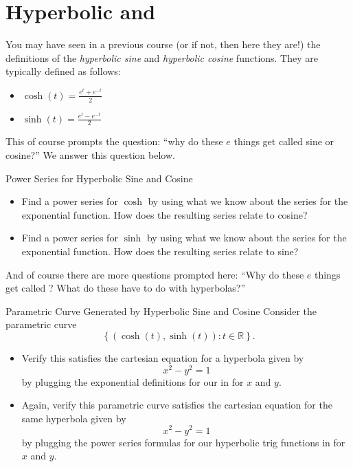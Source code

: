 \section{Hyperbolic  and }

You may have seen in a previous course (or if not, then here they are!) the definitions of the \emph{hyperbolic sine} and \emph{hyperbolic cosine} functions.  They are typically defined as follows:

\begin{itemize}
\item $\cosh(t)=\frac{e^t+e^{-t}}{2}$
\item $\sinh(t)=\frac{e^t-e^{-t}}{2}$
\end{itemize}

This of course prompts the question: ``why do these $e$ things get called sine or cosine?''  We answer this question below.

\begin{exercise}{Power Series for Hyperbolic Sine and Cosine \Coffeecup \Coffeecup}
\begin{itemize}
\item Find a power series for $\cosh$ by using what we know about the series for the exponential function.  How does the resulting series relate to cosine?

\vspace*{2in}

\item Find a power series for $\sinh$ by using what we know about the series for the exponential function.  How does the resulting series relate to sine?
\vspace*{2in}
\end{itemize}
\end{exercise}

And of course there are more questions prompted here: ``Why do these $e$ things get called ?  What do these  have to do with hyperbolas?''

\begin{exercise}{Parametric Curve Generated by Hyperbolic Sine and Cosine \Coffeecup \Coffeecup \Coffeecup} Consider the parametric curve $$\left\{ (\cosh(t),\sinh(t)): t\in \mathbb{R} \right\}.$$ 
\begin{itemize}
\item Verify this  satisfies the cartesian equation for a hyperbola given by $$x^2-y^2=1 $$ by plugging the exponential definitions for our  in for $x$ and $y$.
\vspace*{2in}
\item Again, verify this parametric curve satisfies the cartesian equation for the same hyperbola given by $$x^2-y^2=1 $$
by plugging the power series formulas for our hyperbolic trig functions in for $x$ and $y$. \vspace*{3in}
\end{itemize}
\end{exercise}